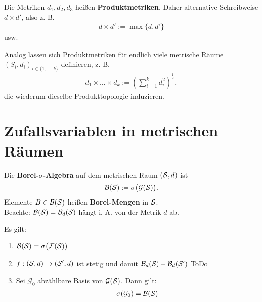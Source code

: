 \begin{defi}
Die Metriken $d_1,d_2,d_3$ heißen \textbf{Produktmetriken}. Daher alternative Schreibweise $d\times d'$, also z. B. 
\begin{align*}
d\times d':=\max\lbrace d,d'\rbrace
\end{align*}
usw.
\end{defi}

\begin{bemerkungnr} %
Analog lassen sich Produktmetriken für \underline{endlich viele} metrische Räume $(S_i,d_i)_{i\in\lbrace1,\ldots,k\rbrace}$ definieren, z. B.
\begin{align*}
d_1\times\ldots\times d_k:=\left(\sum\limits_{i=1}^k d_i^2\right)^{\frac{1}{2}},
\end{align*}
die wiederum dieselbe Produkttopologie induzieren.
\end{bemerkungnr}

\section{Zufallsvariablen in metrischen Räumen}
\begin{definition} %
Die \textbf{Borel-$\sigma$-Algebra} auf dem metrischen Raum $(\S,d)$ ist %
\begin{align*}
\B(\S):=\sigma\big(\mathcal{G}(\S)\big).
\end{align*}
Elemente $B\in\B(\S)$ heißen \textbf{Borel-Mengen} in $\S$.\\
Beachte: $\B(\S)=\B_d(\S)$ hängt i. A. von der Metrik $d$ ab.
\end{definition}

\begin{lemma} %
Es gilt:
\begin{enumerate}[label=(\arabic*)]
\item 
$\begin{aligned}
\B(\S)=\sigma\big(\mathcal{F}(\S)\big)
\end{aligned}$
\item $\begin{aligned}
f:(\S,d)\to(\S',d)
\end{aligned}$ ist stetig und damit $\B_d(\S)-\B_d(\S')$ ToDo
\item Sei $\mathcal{G}_0$ abzählbare Basis von $\mathcal{G}(\S)$. Dann gilt:
\begin{align*}
\sigma(\mathcal{G}_0)=\B(\S)
\end{align*}
\end{enumerate}
\end{lemma}

